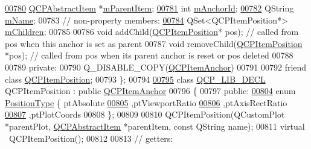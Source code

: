 \begin{DoxyCode}
\hypertarget{a00116_source_l00780}{}\hyperlink{a00032_a80fad480ad3bb980446ed6ebc00818ae}{00780}   \hyperlink{a00022}{QCPAbstractItem} *\hyperlink{a00032_a80fad480ad3bb980446ed6ebc00818ae}{mParentItem};
\hypertarget{a00116_source_l00781}{}\hyperlink{a00032_a00c62070333e8345976b579676ad3997}{00781}   \textcolor{keywordtype}{int} \hyperlink{a00032_a00c62070333e8345976b579676ad3997}{mAnchorId};
\hypertarget{a00116_source_l00782}{}\hyperlink{a00032_a23ad4d0ab0d2cbb41a7baf05bcf996ec}{00782}   QString \hyperlink{a00032_a23ad4d0ab0d2cbb41a7baf05bcf996ec}{mName};
00783   \textcolor{comment}{// non-property members:}
\hypertarget{a00116_source_l00784}{}\hyperlink{a00032_a5f0e67f395a63e2dd0e29ff1dcaf37b7}{00784}   QSet<QCPItemPosition*> \hyperlink{a00032_a5f0e67f395a63e2dd0e29ff1dcaf37b7}{mChildren};
00785   
00786   \textcolor{keywordtype}{void} addChild(\hyperlink{a00038}{QCPItemPosition}* pos); \textcolor{comment}{// called from pos when this anchor is set as parent}
00787   \textcolor{keywordtype}{void} removeChild(\hyperlink{a00038}{QCPItemPosition} *pos); \textcolor{comment}{// called from pos when its parent anchor is reset
       or pos deleted}
00788   
00789 \textcolor{keyword}{private}:
00790   Q\_DISABLE\_COPY(\hyperlink{a00032}{QCPItemAnchor})
00791   
00792   friend class \hyperlink{a00038}{QCPItemPosition};
00793 \};
00794 
\hypertarget{a00116_source_l00795}{}\hyperlink{a00038}{00795} class \hyperlink{a00116_a5eaab02224a642ded7fb8951e973a02c}{QCP\_LIB\_DECL} QCPItemPosition : public \hyperlink{a00032}{QCPItemAnchor}
00796 \{
00797 \textcolor{keyword}{public}:
\hypertarget{a00116_source_l00804}{}\hyperlink{a00038_aad9936c22bf43e3d358552f6e86dbdc8a564f5e53e550ead1ec5fc7fc7d0b73e0}{00804}   \textcolor{keyword}{enum} \hyperlink{a00038_aad9936c22bf43e3d358552f6e86dbdc8}{PositionType} \{ ptAbsolute        
\hypertarget{a00116_source_l00805}{}\hyperlink{a00038_aad9936c22bf43e3d358552f6e86dbdc8ac7d6aa89ceacb39658b0d6da061c789a}{00805}                       ,ptViewportRatio  
\hypertarget{a00116_source_l00806}{}\hyperlink{a00038_aad9936c22bf43e3d358552f6e86dbdc8a01080fd00eaf09fa238ef6b73bbfef75}{00806}                       ,ptAxisRectRatio  
\hypertarget{a00116_source_l00807}{}\hyperlink{a00038_aad9936c22bf43e3d358552f6e86dbdc8ad5ffb8dc99ad73263f7010c77342294c}{00807}                       ,ptPlotCoords     
00808                     \};
00809   
00810   QCPItemPosition(QCustomPlot *parentPlot, \hyperlink{a00022}{QCPAbstractItem} *parentItem, \textcolor{keyword}{const} QString name);
00811   \textcolor{keyword}{virtual} ~QCPItemPosition();
00812   
00813   \textcolor{comment}{// getters:}

\end{DoxyCode}
